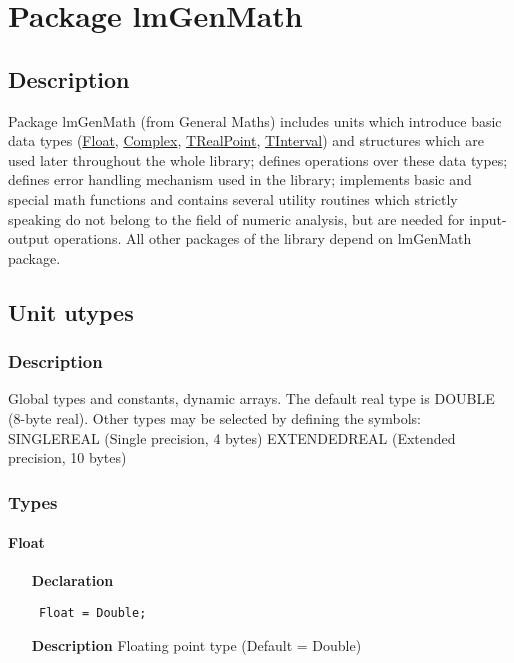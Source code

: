 \documentclass[12pt,a4paper,oneside]{report}
\newcommand{\declarationitem}[1]{\textbf{#1}}
\newcommand{\descriptiontitle}[1]{\textbf{#1}}
\newcommand{\code}[1]{\texttt{#1}}
\begin{document}
\chapter{Package lmGenMath}\label{package-lmGenMath}
\section{Description}
Package lmGenMath (from General Maths) includes units which introduce basic data types (\hyperref[utypes-Float]{Float}, \hyperref[utypes-complex]{Complex}, \hyperref[types:trealpoint]{TRealPoint}, \hyperref[uIntervals.TInterval]{TInterval}) and structures which are used later throughout the whole library; defines operations over these data types; defines error handling mechanism used in the library; implements basic and special math functions and contains several utility routines which strictly speaking do not belong to the field of numeric analysis, but are needed for input-output operations. All other packages of the library depend on lmGenMath package.  


\section{Unit utypes}
\label{utypes}
\subsection{Description}
Global types and constants, dynamic arrays. The default real type is DOUBLE (8{-}byte real). Other types may be selected by defining the symbols:
SINGLEREAL (Single precision, 4 bytes) EXTENDEDREAL (Extended precision, 10 bytes) \subsection{Types}
\subsubsection{Float}
\label{utypes-Float}
\begin{itemize}\item[\declarationitem{Declaration}\hfill]
	\begin{flushleft}
		\code{
			Float = Double;}
		
	\end{flushleft}
	
	\par
	\item[\descriptiontitle{Description}]
	Floating point type (Default = Double)
\end{itemize}
\end{document}
